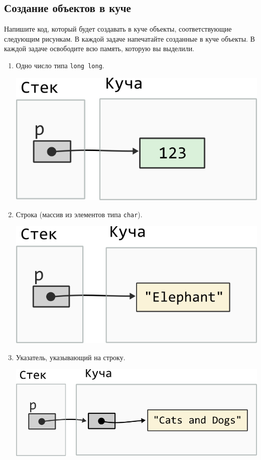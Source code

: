 \documentclass{article}
\begin{document}
\subsection{Создание объектов в куче}

Напишите код, который будет создавать в куче объекты, соответствующие следующим рисункам. В каждой задаче напечатайте созданные в куче объекты. В каждой задаче освободите всю память, которую вы выделили.
\begin{enumerate}
\item Одно число типа \texttt{long long}.
\begin{center}
\includegraphics[scale=\mallocImagesScale]{../images/malloc_homework/00heap_size_t.png}
\end{center}


\item Строка (массив из элементов типа \texttt{char}).
\begin{center}
\includegraphics[scale=\mallocImagesScale]{../images/malloc_homework/01heap_char_array.png}
\end{center}

\item Указатель, указывающий на строку.
\begin{center}
\includegraphics[scale=\mallocImagesScale]{../images/malloc_homework/02heap_pointer_char_array.png}
\end{center}



\end{enumerate}
\end{document}
